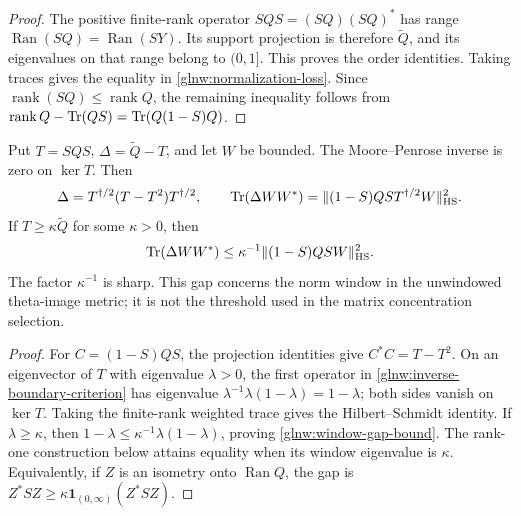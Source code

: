 \begin{proof}
The positive finite-rank operator $SQS=(SQ)(SQ)^*$ has range
$\operatorname{Ran}(SQ)=\operatorname{Ran}(SY)$. Its support
projection is therefore $\widetilde Q$, and its eigenvalues
on that range belong to $(0,1]$. This proves the order
identities. Taking traces gives the equality in
\eqref{glnw:normalization-loss}. Since
$\operatorname{rank}(SQ)\leq\operatorname{rank}Q$,
the remaining inequality follows from
$\operatorname{rank}Q-\operatorname{Tr}(QS)=\operatorname{Tr}(Q(1-S)Q)$.
\end{proof}

\begin{proposition}
\label{glnw:exact-normalization}
Put $T=SQS$, $\Delta=\widetilde Q-T$, and let $W$ be bounded.
The Moore--Penrose inverse is zero on $\ker T$. Then
\begin{equation}\label{glnw:inverse-boundary-criterion}
 \Delta=T^{\dagger/2}(T-T^2)T^{\dagger/2},\qquad
 \operatorname{Tr}(\Delta WW^*)
   =\|(1-S)QS T^{\dagger/2}W\|_{\mathrm{HS}}^2 .
\end{equation}
If $T\geq\kappa\widetilde Q$ for some $\kappa>0$, then
\begin{equation}\label{glnw:window-gap-bound}
 \operatorname{Tr}(\Delta WW^*)
 \leq\kappa^{-1}\|(1-S)QS W\|_{\mathrm{HS}}^2 .
\end{equation}
The factor $\kappa^{-1}$ is sharp. This gap concerns the norm
window in the unwindowed theta-image metric; it is not the
threshold used in the matrix concentration selection.
\end{proposition}
\begin{proof}
For $C=(1-S)QS$, the projection identities give
$C^*C=T-T^2$. On an eigenvector of $T$ with eigenvalue
$\lambda>0$, the first operator in
\eqref{glnw:inverse-boundary-criterion} has eigenvalue
$\lambda^{-1}\lambda(1-\lambda)=1-\lambda$; both sides
vanish on $\ker T$. Taking the finite-rank weighted trace gives
the Hilbert--Schmidt identity. If $\lambda\geq\kappa$, then
$1-\lambda\leq\kappa^{-1}\lambda(1-\lambda)$, proving
\eqref{glnw:window-gap-bound}. The rank-one construction below
attains equality when its window eigenvalue is $\kappa$.
Equivalently, if $Z$ is an isometry onto $\operatorname{Ran}Q$,
the gap is $Z^*SZ\geq\kappa\mathbf1_{(0,\infty)}(Z^*SZ)$.
\end{proof}

